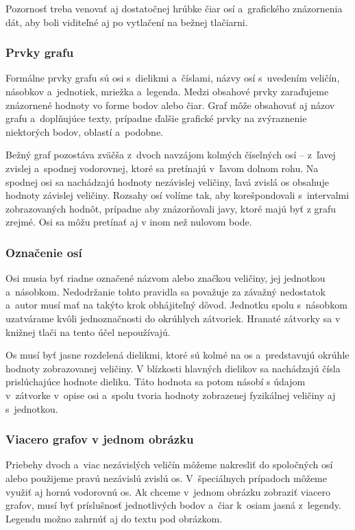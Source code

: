 Pozornosť treba venovať aj dostatočnej hrúbke čiar osí
a~grafického znázornenia dát,
aby boli viditeľné aj po vytlačení na bežnej tlačiarni.

\subsubsection{Prvky grafu}
Formálne prvky grafu sú osi s~dielikmi a~číslami,
názvy osí s~uvedením veličín, násobkov a~jednotiek,
mriežka a~legenda.
Medzi obsahové prvky zaraďujeme znázornené hodnoty vo forme 
bodov alebo čiar.
Graf môže obsahovať aj názov grafu
a~doplňujúce texty,
prípadne ďalšie grafické prvky na zvýraznenie niektorých bodov, 
oblastí a~podobne.

Bežný graf pozostáva zväčša z~dvoch navzájom kolmých číselných 
osí – z~ľavej zvislej a~spodnej vodorovnej,
ktoré sa pretínajú v~ľavom dolnom rohu.
Na spodnej osi sa nachádzajú hodnoty nezávislej veličiny,
ľavá zvislá os obsahuje hodnoty závislej veličiny.
Rozsahy osí volíme tak,
aby korešpondovali s~intervalmi zobrazovaných hodnôt,
prípadne aby znázorňovali javy,
ktoré majú byť z grafu zrejmé.
Osi sa môžu pretínať aj v inom než nulovom bode.

\subsubsection{Označenie osí}
Osi musia byť riadne označené názvom alebo značkou veličiny,
jej jednotkou a~násobkom.
Nedodržanie tohto pravidla sa považuje za závažný nedostatok
a~autor musí mať na takýto krok obhájiteľný dôvod.
Jednotku spolu s~násobkom uzatvárame kvôli jednoznačnosti
do okrúhlych zátvoriek.
Hranaté zátvorky sa v knižnej tlači na tento účel nepoužívajú.

Os musí byť jasne rozdelená dielikmi,
ktoré sú kolmé na os a~predstavujú okrúhle hodnoty
zobrazovanej veličiny.
V blízkosti hlavných dielikov sa nachádzajú čísla prislúchajúce 
hodnote dieliku.
Táto hodnota sa potom násobí s údajom v~zátvorke
v~opise osi a~spolu tvoria hodnoty zobrazenej fyzikálnej 
veličiny aj s~jednotkou.

\subsubsection{Viacero grafov v jednom obrázku}
Priebehy dvoch a~viac nezávislých veličín môžeme nakresliť
do spoločných osí alebo použijeme pravú nezávislú zvislú os.
V~špeciálnych prípadoch môžeme využiť aj hornú vodorovnú os.
Ak chceme v~jednom obrázku zobraziť viacero grafov,
musí byť príslušnosť jednotlivých bodov a~čiar k~osiam jasná
z~legendy.
Legendu možno zahrnúť aj do textu pod obrázkom.


